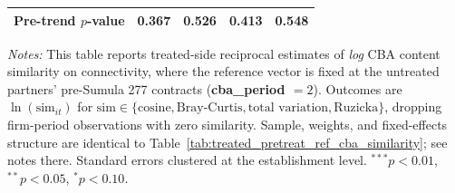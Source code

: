 \begin{table}[H]
\begin{tabular}{lcccc}
Pre-trend $p$-value & 0.367 & 0.526 & 0.413 & 0.548 \\
\bottomrule
\end{tabular}
\begin{minipage}{\linewidth}
\footnotesize\vspace{4pt}
\textit{Notes:} This table reports treated-side reciprocal estimates of \emph{log} CBA content similarity on connectivity, where the reference vector is fixed at the untreated partners' pre-Sumula 277 contracts (\textbf{cba\_period $= 2$}). Outcomes are $\ln(\text{sim}_{it})$ for $\text{sim} \in \{\text{cosine}, \text{Bray-Curtis}, \text{total variation}, \text{Ruzicka}\}$, dropping firm-period observations with zero similarity. Sample, weights, and fixed-effects structure are identical to Table~\ref{tab:treated_pretreat_ref_cba_similarity}; see notes there. Standard errors clustered at the establishment level. $^{***}p<0.01$, $^{**}p<0.05$, $^{*}p<0.10$.
\end{minipage}
\end{table}
